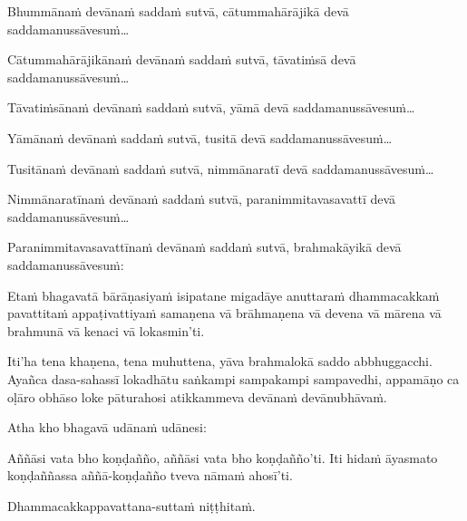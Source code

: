 
Bhummānaṁ devānaṁ saddaṁ sutvā, cātummahārājikā devā
saddamanussāvesuṁ\ldots

Cātummahārājikānaṁ devānaṁ saddaṁ sutvā, tāvatiṁsā devā
saddamanussāvesuṁ\ldots

Tāvatiṁsānaṁ devānaṁ saddaṁ sutvā, yāmā devā saddamanussāvesuṁ\ldots

Yāmānaṁ devānaṁ saddaṁ sutvā, tusitā devā saddamanussāvesuṁ\ldots

Tusitānaṁ devānaṁ saddaṁ sutvā, nimmānaratī devā saddamanussāvesuṁ\ldots

Nimmānaratīnaṁ devānaṁ saddaṁ sutvā, paranimmitavasavattī devā
saddamanussāvesuṁ\ldots

Paranimmitavasavattīnaṁ devānaṁ saddaṁ sutvā, brahmakāyikā devā
saddamanussāvesuṁ:

Etaṁ bhagavatā bārāṇasiyaṁ isipatane migadāye anuttaraṁ dhammacakkaṁ
pavattitaṁ appaṭivattiyaṁ samaṇena vā brāhmaṇena vā devena vā mārena vā
brahmunā vā kenaci vā lokasmin'ti.

Iti'ha tena khaṇena, tena muhuttena, yāva brahmalokā saddo abbhuggacchi.
Ayañca dasa-sahassī lokadhātu saṅkampi sampakampi sampavedhi, appamāṇo ca
oḷāro obhāso loke pāturahosi atikkammeva devānaṁ devānubhāvaṁ.

Atha kho bhagavā udānaṁ udānesi:

Aññāsi vata bho koṇḍañño, aññāsi vata bho koṇḍañño'ti. Iti hidaṁ āyasmato
koṇḍaññassa aññā-koṇḍañño tveva nāmaṁ ahosī'ti.

Dhammacakkappavattana-suttaṁ niṭṭhitaṁ.


